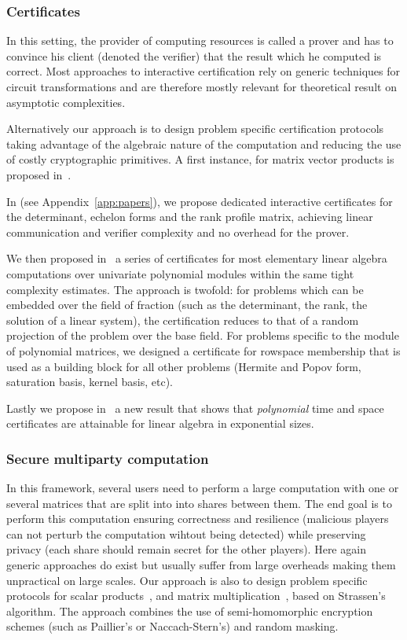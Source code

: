 \documentclass{deliverablereport}
\begin{document}
\subsubsection{Certificates}

In this setting, the provider of computing resources is called a
prover and has to
convince his client (denoted the verifier) that the result which he computed is
correct.
Most approaches to interactive certification rely on generic techniques for
circuit transformations and are therefore mostly relevant for theoretical result
on asymptotic complexities. 

Alternatively our approach is to design problem specific certification protocols
taking advantage of the algebraic nature of the computation and
reducing the use of costly
cryptographic primitives. A first instance, for matrix vector products is
proposed in~\cite{DuZu17}.

In \cite{DLP17} (see Appendix~\ref{app:papers}), we propose dedicated interactive
certificates for the determinant, echelon forms and the rank profile matrix,
achieving linear communication and verifier complexity and no overhead for the prover.

We then proposed in~\cite{LNPRR18}  a series of certificates for most
elementary linear algebra computations over univariate polynomial modules within
the same tight complexity estimates. The approach is twofold: for problems which
can be embedded over the field of fraction (such as the determinant, the rank,
the solution of a linear system), the certification reduces to that of a random
projection of the problem over the base field. For problems specific to the
module of polynomial matrices, we designed a certificate for rowspace membership
that is used as a building block for all other problems (Hermite and Popov form,
saturation basis, kernel basis, etc).

Lastly we propose in~\cite{DKVZ17} a new result that shows that 
{\em polynomial} time and space certificates are attainable for linear
algebra in exponential sizes. 

\subsubsection{Secure multiparty computation}

In this framework, several users need to perform a large computation with one or several
matrices that are split into into shares between them. The end goal is to
perform this computation ensuring correctness and resilience (malicious players
can not perturb the computation wihtout being detected) while preserving privacy (each
share should remain secret for the other players).
Here again generic approaches do exist but usually suffer from large overheads
making them 
unpractical on large scales.
Our approach is also to design problem specific protocols for scalar
products~\cite{DLOP17}, and matrix multiplication~\cite{DFLLOPP18}, based on
Strassen's algorithm. The approach combines the use of semi-homomorphic
encryption schemes (such as Paillier's or Naccach-Stern's) and random masking.
\end{document}
